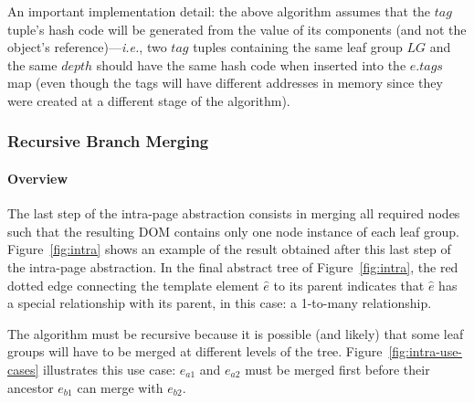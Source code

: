 An important implementation detail: the above algorithm assumes that the $tag$ tuple's hash code will be generated from the value of its components (and not the object's reference)---\emph{i.e.}, two $tag$ tuples containing the same leaf group $LG$ and the same $depth$ should have the same hash code when inserted into the $e.tags$ map (even though the tags will have different addresses in memory since they were created at a different stage of the algorithm).

\subsubsection{Recursive Branch Merging}
\paragraph{Overview}\label{sec:overview}
The last step of the intra-page abstraction consists in merging all required nodes such that the resulting DOM contains only one node instance of each leaf group. 
Figure~\ref{fig:intra} shows an example of the result obtained after this last step of the intra-page abstraction. 
In the final abstract tree of Figure~\ref{fig:intra}, the red dotted edge connecting the template element $\hat{e}$ to its parent indicates that $\hat{e}$ has a special relationship with its parent, in this case: a 1-to-many relationship.

The algorithm must be recursive because it is possible (and likely) that some leaf groups will have to be merged at different levels of the tree. 
Figure~\ref{fig:intra-use-cases} illustrates this use case: $e_{a1}$ and $e_{a2}$ must be merged first before their ancestor $e_{b1}$ can merge with $e_{b2}$.

